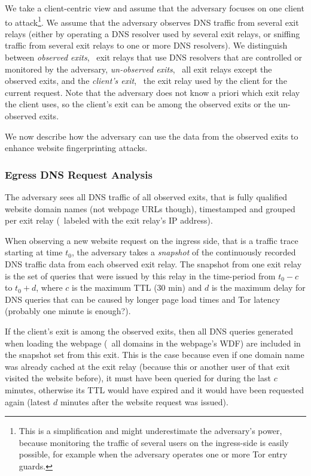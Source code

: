 We take a client-centric view and assume that the adversary focuses on
one client to attack\footnote{This is a simplification and might
underestimate the adversary's power, because monitoring the traffic of
several users on the ingress-side is easily possible, for example when
the adversary operates one or more Tor entry guards.}.
%
We assume that the adversary observes DNS traffic from several exit
relays (either by operating a DNS resolver used by several exit relays,
or sniffing traffic from several exit relays to one or more DNS
resolvers).
%
We distinguish between \emph{observed exits}, \ie~exit relays that use
DNS resolvers that are controlled or monitored by the adversary,
\emph{un-observed exits}, \ie~all exit relays except the observed exits,
and the \emph{client's exit}, \ie~the exit relay used by the client for
the current request.
%
Note that the adversary does not know a priori which exit relay the
client uses, so the client's exit can be among the observed exits or the
un-observed exits.

%
We now describe how the adversary can use the data from the observed
exits to enhance website fingerprinting attacks.


\subsubsection{Egress DNS Request Analysis}

The adversary sees all DNS traffic of all observed exits, that is fully
qualified website domain names (not webpage URLs though), timestamped
and grouped per exit relay (\eg~labeled with the exit relay's IP
address).

When observing a new website request on the ingress side, that is a
traffic trace starting at time $t_0$, the adversary takes a
\emph{snapshot} of the continuously recorded DNS traffic data from each
observed exit relay.  The snapshot from one exit relay is the set of
queries that were issued by this relay in the time-period from $t_0 - c$
to $t_0 + d$, where $c$ is the maximum TTL (30 min) and $d$ is the
maximum delay for DNS queries that can be caused by longer page load
times and Tor latency (probably one minute is enough?).

If the client's exit is among the observed exits, then all DNS queries
generated when loading the webpage (\ie~all domains in the webpage's
WDF) are included in the snapshot set from this exit. This is the case
because even if one domain name was already cached at the exit relay
(because this or another user of that exit visited the website before),
it must have been queried for during the last $c$ minutes, otherwise its
TTL would have expired and it would have been requested again (latest
$d$ minutes after the website request was issued).

